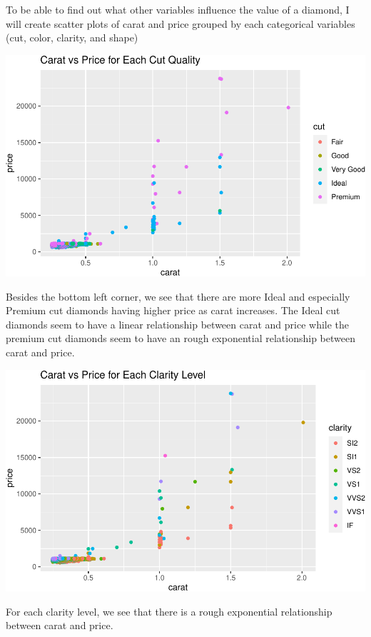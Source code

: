 \documentclass[
]{article}
\begin{document}
To be able to find out what other variables influence the value of a
diamond, I will create scatter plots of carat and price grouped by each
categorical variables (cut, color, clarity, and shape)

\begin{center}\includegraphics[width=0.8\linewidth]{Methods_and_Results_files/figure-latex/unnamed-chunk-14-1} \end{center}

Besides the bottom left corner, we see that there are more Ideal and
especially Premium cut diamonds having higher price as carat increases.
The Ideal cut diamonds seem to have a linear relationship between carat
and price while the premium cut diamonds seem to have an rough
exponential relationship between carat and price.

\begin{center}\includegraphics[width=0.8\linewidth]{Methods_and_Results_files/figure-latex/unnamed-chunk-15-1} \end{center}

For each clarity level, we see that there is a rough exponential
relationship between carat and price.
\end{document}
